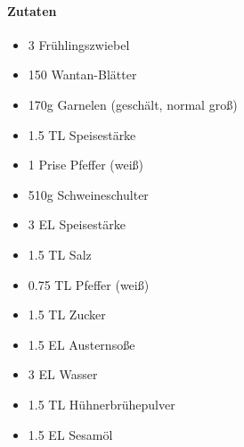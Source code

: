 \newpage
{}

\paragraph{Zutaten}
\begin{itemize}[noitemsep]
	\item 3 Frühlingszwiebel
	\item 150 Wantan-Blätter
	\item 170g Garnelen (geschält, normal groß)
	\item 1.5 TL Speisestärke
	\item 1 Prise Pfeffer (weiß)
	\item 510g Schweineschulter
	\item 3 EL Speisestärke
	\item 1.5 TL Salz
	\item 0.75 TL Pfeffer (weiß)
	\item 1.5 TL Zucker
	\item 1.5 EL Austernsoße
	\item 3 EL Wasser
	\item 1.5 TL Hühnerbrühepulver
	\item 1.5 EL Sesamöl
\end{itemize}

